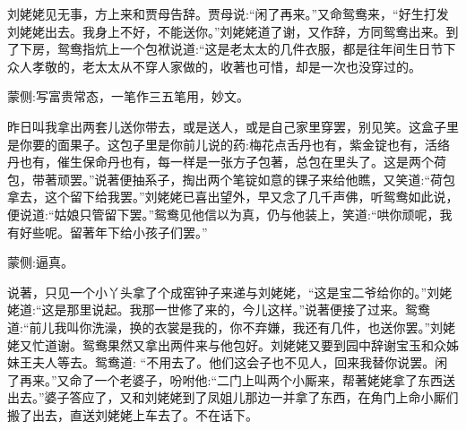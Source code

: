 \begin{parag}
    刘姥姥见无事，方上来和贾母告辞。贾母说:“闲了再来。”又命鸳鸯来，“好生打发刘姥姥出去。我身上不好，不能送你。”刘姥姥道了谢，又作辞，方同鸳鸯出来。到了下房，鸳鸯指炕上一个包袱说道:“这是老太太的几件衣服，都是往年间生日节下众人孝敬的，老太太从不穿人家做的，收著也可惜，却是一次也没穿过的。\begin{note}蒙侧:写富贵常态，一笔作三五笔用，妙文。\end{note}昨日叫我拿出两套儿送你带去，或是送人，或是自己家里穿罢，别见笑。这盒子里是你要的面果子。这包子里是你前儿说的药:梅花点舌丹也有，紫金锭也有，活络丹也有，催生保命丹也有，每一样是一张方子包著，总包在里头了。这是两个荷包，带著顽罢。”说著便抽系子，掏出两个笔锭如意的锞子来给他瞧，又笑道:“荷包拿去，这个留下给我罢。”刘姥姥已喜出望外，早又念了几千声佛，听鸳鸯如此说，便说道:“姑娘只管留下罢。”鸳鸯见他信以为真，仍与他装上，笑道:“哄你顽呢，我有好些呢。留著年下给小孩子们罢。”\begin{note}蒙侧:逼真。\end{note}说著，只见一个小丫头拿了个成窑钟子来递与刘姥姥，“这是宝二爷给你的。”刘姥姥道:“这是那里说起。我那一世修了来的，今儿这样。”说著便接了过来。鸳鸯道:“前儿我叫你洗澡，换的衣裳是我的，你不弃嫌，我还有几件，也送你罢。”刘姥姥又忙道谢。鸳鸯果然又拿出两件来与他包好。刘姥姥又要到园中辞谢宝玉和众姊妹王夫人等去。鸳鸯道: “不用去了。他们这会子也不见人，回来我替你说罢。闲了再来。”又命了一个老婆子，吩咐他:“二门上叫两个小厮来，帮著姥姥拿了东西送出去。”婆子答应了，又和刘姥姥到了凤姐儿那边一并拿了东西，在角门上命小厮们搬了出去，直送刘姥姥上车去了。不在话下。
\end{parag}


